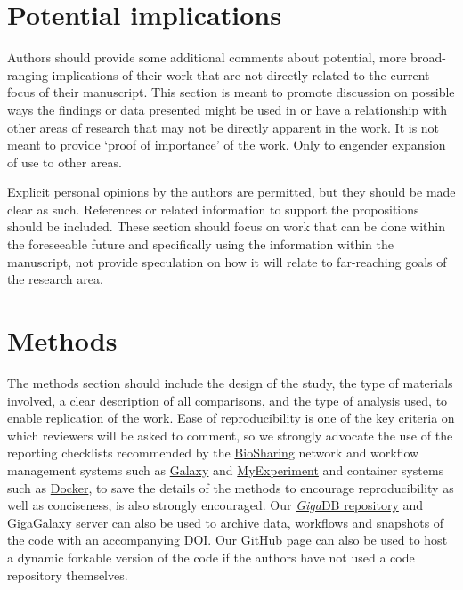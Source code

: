 \documentclass[a4paper,num-refs]{oup-contemporary}
\begin{document}
\section{Potential implications}

Authors should provide some additional comments about potential, more broad-ranging implications of their work that are not directly related to the current focus of their manuscript. This section is meant to promote discussion on possible ways the findings or data presented might be used in or have a relationship with other areas of research that may not be directly apparent in the work. It is not meant to provide `proof of importance' of the work. Only to engender expansion of use to other areas. 

Explicit personal opinions by the authors are permitted, but they should be made clear as such. References or related information to support the propositions should be included. These section should focus on work that can be done within the foreseeable future and specifically using the information within the manuscript, not provide speculation on how it will relate to far-reaching goals of the research area.

\section{Methods}

The methods section should include the design of the study, the type of materials involved, a clear description of all comparisons, and the type of analysis used, to enable replication of the work. Ease of reproducibility is one of the key criteria on which reviewers will be asked to comment, so we strongly advocate the use of the reporting checklists recommended by the \href{https://biosharing.org/}{BioSharing} network and workflow management systems such as \href{https:/galaxyproject.org/}{Galaxy} and \href{http://www.myexperiment.org/home}{MyExperiment} and container systems such as \href{https://www.docker.com/}{Docker}, to save the details of the methods to encourage reproducibility as well as conciseness, is also strongly encouraged. Our \href{http://gigadb.org/}{\textit{Giga}DB repository}{} and \href{http://galaxy.cbiit.cuhk.edu.hk/}{GigaGalaxy} server can also be used to archive data, workflows and snapshots of the code with an accompanying DOI. Our \href{https://github.com/gigascience/papers}{GitHub page} can also be used to host a dynamic forkable version of the code if the authors have not used a code repository themselves.
\end{document}
